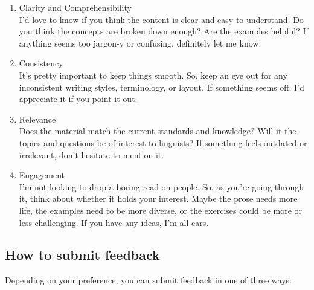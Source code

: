 \documentclass[
  letterpaper,
  DIV=11,
  numbers=noendperiod]{scrreport}
\theoremstyle{definition}
\theoremstyle{remark}
\begin{document}
\begin{enumerate}
\def\labelenumi{\arabic{enumi}.}
\item
  Clarity and Comprehensibility\\
  I'd love to know if you think the content is clear and easy to
  understand. Do you think the concepts are broken down enough? Are the
  examples helpful? If anything seems too jargon-y or confusing,
  definitely let me know.
\item
  Consistency\\
  It's pretty important to keep things smooth. So, keep an eye out for
  any inconsistent writing styles, terminology, or layout. If something
  seems off, I'd appreciate it if you point it out.
\item
  Relevance\\
  Does the material match the current standards and knowledge? Will it
  the topics and questions be of interest to linguists? If something
  feels outdated or irrelevant, don't hesitate to mention it.
\item
  Engagement\\
  \hspace{0pt}I\hspace{0pt}'m not looking to drop a boring read on
  people. So, as you're going through it, think about whether it holds
  your interest. Maybe \hspace{0pt}the prose needs more life, the
  examples need to be more diverse, or the exercises could be more or
  less challenging. If you have any ideas, I'm all ears.
\end{enumerate}

\hypertarget{how-to-submit-feedback}{%
\subsection*{How to submit feedback}\label{how-to-submit-feedback}}

Depending on your preference, you can submit feedback in one of three
ways:
\end{document}
